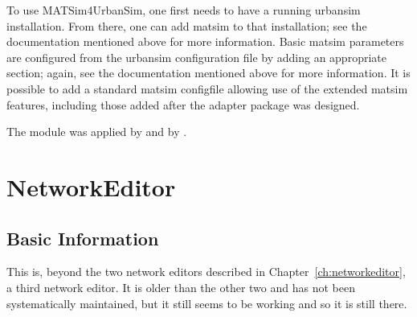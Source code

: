 To use MATSim4UrbanSim, one first needs to have a running \gls{urbansim} installation. 
From there, one can add \gls{matsim} to that installation; see %
the documentation mentioned above for more information. 
Basic \gls{matsim} parameters are configured from the \gls{urbansim} configuration file by adding an appropriate section; again, see 
the documentation mentioned above for more information. 
It is possible to add a standard \gls{matsim} \gls{configfile} allowing use of the extended \gls{matsim} features, including those added after the adapter package was designed.

The module was applied by \citet{CabritaEtcSustaincityHandbookBrusselsChapter} and by \citet[][]{ZoelligRenner_PhDThesis_2014}.

\section{NetworkEditor}
\label{sec:contrib-networkEditor}

\subsection{Basic Information}

This is, beyond the two network editors described in Chapter~\ref{ch:networkeditor}, a third network editor. 
It is older than the other two and has not been systematically maintained, but it still seems to be working and so it is still there.


